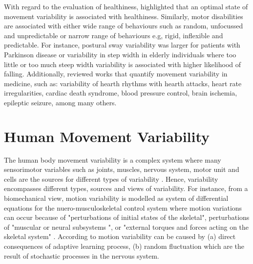 With regard to the evaluation of healthiness, \cite{stergiou2011} highlighted that 
an optimal state of movement variability is associated with healthiness. 
Similarly, motor disabilities are associated with either wide range of behaviours 
such as random, unfocussed and unpredictable or narrow range of behaviours e.g, 
rigid, inflexible and predictable. For instance, postural sway variability was larger 
for patients with Parkinson disease or variability in step width in elderly 
individuals where too little or too much steep width variability 
is associated with higher likelihood of falling.
Additionally, \cite{stergiou2011} reviewed works that quantify movement variability 
in medicine, such as: variability of hearth rhythms with hearth attacks, 
heart rate irregularities, cardiac death syndrome, blood pressure control, 
brain ischemia, epileptic seizure,  among many others.






\section{Human Movement Variability}

The human body movement variability is a complex system where many sensorimotor 
variables such as joints, muscles, nervous system, motor unit and cells are the sources 
for different types of variability \cite{newell1993}.
Hence, variability encompasses different types, sources and views of variability.
For instance, from a biomechanical view, motion variability is modelled
as system of differential equations for the nuero-musculoskeletal 
control system where motion variations can occur because of 
"perturbations of initial states of the skeletal",
perturbations of "muscular or neural subsystems ",
or "external torques and forces acting on the skeletal system" 
\cite{hatze1986}.
According to \cite{hatze1986} motion variability can be caused by 
(a) direct consequences of adaptive learning process, 
(b) random fluctuation which are the result of stochastic processes in the
nervous system.

